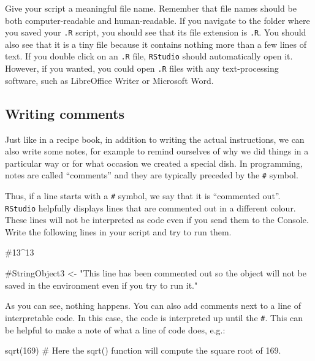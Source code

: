 \documentclass[
  letterpaper,
  DIV=11,
  numbers=noendperiod,
  oneside]{scrreprt}
\newenvironment{Shaded}{\begin{snugshade}}{\end{snugshade}}
\newcommand{\CommentTok}[1]{\textcolor[rgb]{0.37,0.37,0.37}{#1}}
\newcommand{\DecValTok}[1]{\textcolor[rgb]{0.68,0.00,0.00}{#1}}
\newcommand{\FunctionTok}[1]{\textcolor[rgb]{0.28,0.35,0.67}{#1}}
\newcommand{\NormalTok}[1]{\textcolor[rgb]{0.00,0.23,0.31}{#1}}
\begin{document}
Give your script a meaningful file name. Remember that file names should
be both computer-readable and human-readable. If you navigate to the
folder where you saved your \texttt{.R} script, you should see that its
file extension is \texttt{.R}. You should also see that it is a tiny
file because it contains nothing more than a few lines of text. If you
double click on an \texttt{.R} file, \texttt{RStudio} should
automatically open it. However, if you wanted, you could open
\texttt{.R} files with any text-processing software, such as LibreOffice
Writer or Microsoft Word.

\subsection{Writing comments}\label{writing-comments}

Just like in a recipe book, in addition to writing the actual
instructions, we can also write some notes, for example to remind
ourselves of why we did things in a particular way or for what occasion
we created a special dish. In programming, notes are called ``comments''
and they are typically preceded by the \texttt{\#} symbol.

Thus, if a line starts with a \texttt{\#} symbol, we say that it is
``commented out''. \texttt{RStudio} helpfully displays lines that are
commented out in a different colour. These lines will not be interpreted
as code even if you send them to the Console. Write the following lines
in your script and try to run them.

\begin{Shaded}
\begin{Highlighting}[]
\CommentTok{\#13\^{}13}

\CommentTok{\#StringObject3 \textless{}{-} "This line has been commented out so the object will not be saved in the environment even if you try to run it."}
\end{Highlighting}
\end{Shaded}

As you can see, nothing happens. You can also add comments next to a
line of interpretable code. In this case, the code is interpreted up
until the \texttt{\#}. This can be helpful to make a note of what a line
of code does, e.g.:

\begin{Shaded}
\begin{Highlighting}[]
\FunctionTok{sqrt}\NormalTok{(}\DecValTok{169}\NormalTok{) }\CommentTok{\# Here the sqrt() function will compute the square root of 169.}
\end{Highlighting}
\end{Shaded}
\end{document}
